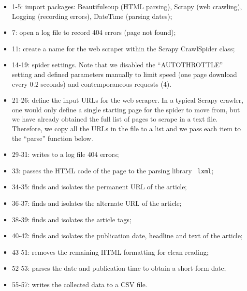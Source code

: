 \documentclass[12pt]{article}
\begin{document}
\begin{itemize}
\item 1-5: import packages: Beautifulsoup (HTML parsing), Scrapy (web
crawling), Logging (recording errors), DateTime (parsing dates);

\item 7: open a log file to record 404 errors (page not found);

\item 11: create a name for the web scraper within the Scrapy CrawlSpider
class;

\item 14-19: spider settings. Note that we disabled the ``AUTOTHROTTLE''
setting and defined parameters manually to limit speed (one page download
every 0.2 seconds) and contemporaneous requests (4).

\item 21-26: define the input URLs for the web scraper. In a typical Scrapy
crawler, one would only define a single starting page for the spider to move
from, but we have already obtained the full list of pages to scrape in a
text file. Therefore, we copy all the URLs in the file to a list and we pass
each item to the ``parse'' function below.

\item 29-31: writes to a log file 404 errors;

\item 33: passes the HTML code of the page to the parsing library \texttt{%
lxml};

\item 34-35: finds and isolates the permanent URL of the article;

\item 36-37: finds and isolates the alternate URL of the article;

\item 38-39: finds and isolates the article tags;

\item 40-42: finds and isolates the publication date, headline and text of
the article;

\item 43-51: removes the remaining HTML formatting for clean reading;

\item 52-53: parses the date and publication time to obtain a short-form
date;

\item 55-57: writes the collected data to a CSV file.
\end{itemize}
\end{document}
